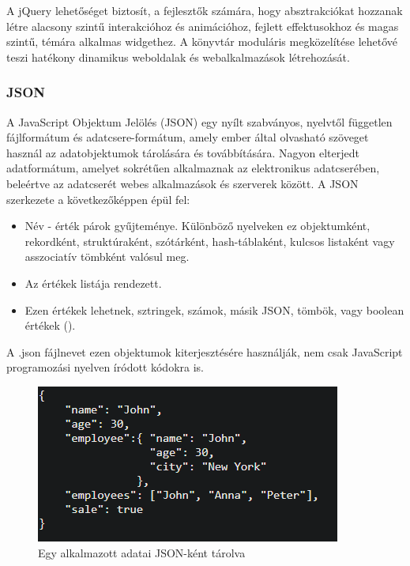 	 A jQuery lehetőséget biztosít, a fejlesztők számára, hogy absztrakciókat hozzanak létre alacsony szintű interakcióhoz és animációhoz, fejlett effektusokhoz és magas szintű, témára alkalmas widgethez. A könyvtár moduláris megközelítése lehetővé teszi hatékony dinamikus weboldalak és webalkalmazások létrehozását. \\

\subsubsection{JSON}

A JavaScript Objektum Jelölés (JSON) egy nyílt szabványos,  nyelvtől független fájlformátum és adatcsere-formátum, amely ember által olvasható szöveget használ az adatobjektumok tárolására és továbbítására. Nagyon elterjedt adatformátum, amelyet sokrétűen alkalmaznak az elektronikus adatcserében, beleértve az adatcserét webes alkalmazások és szerverek között. A JSON szerkezete a következőképpen épül fel: \\

\begin{itemize}
\item Név - érték párok gyűjteménye. Különböző nyelveken ez objektumként, rekordként, struktúraként, szótárként, hash-táblaként, kulcsos listaként vagy asszociatív tömbként valósul meg.
\item Az értékek listája rendezett. 
\item Ezen értékek lehetnek, sztringek, számok,  másik JSON, tömbök, vagy boolean értékek ().
\end{itemize}

A .json fájlnevet ezen objektumok kiterjesztésére használják, nem csak JavaScript programozási nyelven íródott kódokra is.

\begin{figure}[h]
\centering
\includegraphics[scale=0.9]{images/jsonExample.png}
\caption{Egy alkalmazott adatai JSON-ként tárolva }
\label{fig:jsonExample}
\end{figure}

